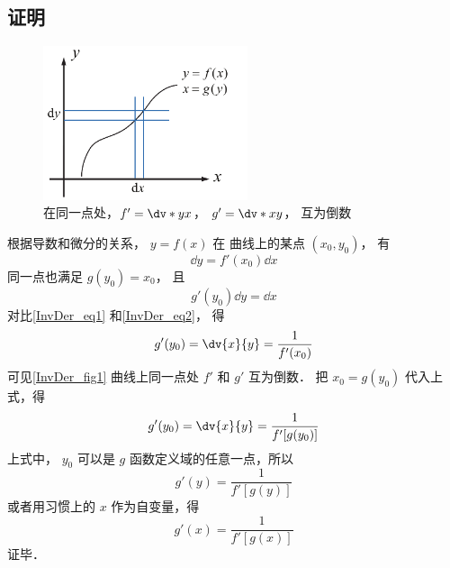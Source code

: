 \subsection{证明}
\begin{figure}[ht]
\centering
\includegraphics[width=6cm]{./figures/InvDer.pdf}
\caption{在同一点处，$f'=\dv*{y}{x}$， $g'=\dv*{x}{y}$， 互为倒数}\label{InvDer_fig1}
\end{figure}
根据导数和微分的关系， $y = f(x)$ 在 曲线上的某点 $(x_0, y_0)$， 有
 \begin{equation}\label{InvDer_eq1}
\dd{y} = f'(x_0) \dd{x}
\end{equation}
同一点也满足 $g(y_0) = x_0$， 且
 \begin{equation}\label{InvDer_eq2}
g'(y_0)\dd{y} = \dd{x}
\end{equation}
对比\autoref{InvDer_eq1} 和\autoref{InvDer_eq2}， 得
\begin{equation}
g'(y_0) = \dv{x}{y} = \frac{1}{f'(x_0)}
\end{equation}
可见\autoref{InvDer_fig1} 曲线上同一点处 $f'$ 和 $g'$ 互为倒数． 把 ${x_0} = g(y_0)$ 代入上式，得
\begin{equation}
g'(y_0) = \dv{x}{y} = \frac{1}{f'[g(y_0)]}
\end{equation} 
上式中， ${y_0}$ 可以是 $g$ 函数定义域的任意一点，所以
\begin{equation}
g'(y) = \frac{1}{f'[g(y)]}
\end{equation} 
或者用习惯上的 $x$ 作为自变量，得
\begin{equation}
g'(x) = \frac{1}{f'[g(x)]}
\end{equation}
证毕．
















